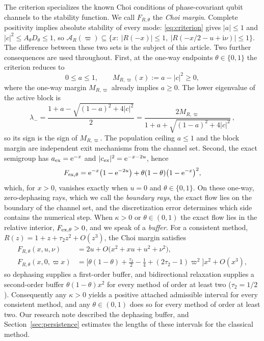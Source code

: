 \documentclass[pdflatex,sn-mathphys-num]{sn-jnl}
\newcommand{\e}{\mathrm{e}}
\newcommand{\ii}{\mathrm{i}}
\newcommand{\Fmargin}{F_{R,\theta}}
\newcommand{\Mmargin}{M_{R,\varpi}}
\newcommand{\Adm}{\mathcal A}
\theoremstyle{thmstyleone}
\theoremstyle{thmstylethree}
\theoremstyle{thmstyletwo}
\begin{document}
The criterion specializes the known Choi conditions of phase-covariant qubit channels \cite{RuskaiSzarekWerner2002,Siudzinska2023Geometry} to the stability function. We call $\Fmargin$ the \emph{Choi margin}. Complete positivity implies absolute stability of every mode: \eqref{eq:criterion} gives $|a|\le1$ and $|c|^2\le A_\theta D_\theta\le1$, so $\Adm_R(\varpi)\subseteq\{x:\ |R(-x)|\le1,\ |R(-x/2-u+\ii\nu)|\le1\}$. The difference between these two sets is the subject of this article. Two further consequences are used throughout. First, at the one-way endpoints $\theta\in\{0,1\}$ the criterion reduces to
\begin{equation}
 0\le a\le1,\qquad \Mmargin(x):=a-|c|^2\ge0,
 \label{eq:one_way_criterion}
\end{equation}
where the one-way margin $\Mmargin$ already implies $a\ge0$. The lower eigenvalue of the active block is
\begin{equation}
 \lambda_-=\frac{1+a-\sqrt{(1-a)^2+4|c|^2}}{2}
 =\frac{2\Mmargin}{1+a+\sqrt{(1-a)^2+4|c|^2}}\,,
 \label{eq:lambda_margin}
\end{equation}
so its sign is the sign of $\Mmargin$. The population ceiling $a\le1$ and the block margin are independent exit mechanisms from the channel set. Second, the exact semigroup has $a_{\rm ex}=\e^{-x}$ and $|c_{\rm ex}|^2=\e^{-x-2u}$, hence
\begin{equation}
 F_{{\rm ex},\theta}=\e^{-x}\big(1-\e^{-2u}\big)+\theta(1-\theta)\big(1-\e^{-x}\big)^2,
 \label{eq:exact_buffer}
\end{equation}
which, for $x>0$, vanishes exactly when $u=0$ and $\theta\in\{0,1\}$. On these one-way, zero-dephasing rays, which we call the \emph{boundary rays}, the exact flow lies on the boundary of the channel set, and the discretization error determines which side contains the numerical step. When $\kappa>0$ or $\theta\in(0,1)$ the exact flow lies in the relative interior, $F_{{\rm ex},\theta}>0$, and we speak of a \emph{buffer}. For a consistent method, $R(z)=1+z+\tau_2z^2+O(z^3)$, the Choi margin satisfies
\begin{equation}
\begin{aligned}
 \Fmargin(x,u,\nu)&=2u+O\big(x^2+xu+u^2+\nu^2\big),\\
 \Fmargin(x,0,\varpi x)&=\Big[\theta(1-\theta)+\frac{\tau_2}{2}-\frac14+(2\tau_2-1)\varpi^2\Big]x^2+O(x^3),
\end{aligned}
 \label{eq:buffers}
\end{equation}
so dephasing supplies a first-order buffer, and bidirectional relaxation supplies a second-order buffer $\theta(1-\theta)x^2$ for every method of order at least two ($\tau_2=1/2$). Consequently any $\kappa>0$ yields a positive attached admissible interval for every consistent method, and any $\theta\in(0,1)$ does so for every method of order at least two. Our research note \cite{PierpointBernardLiu2026Note} described the dephasing buffer, and Section~\ref{sec:persistence} estimates the lengths of these intervals for the classical method.
\end{document}
